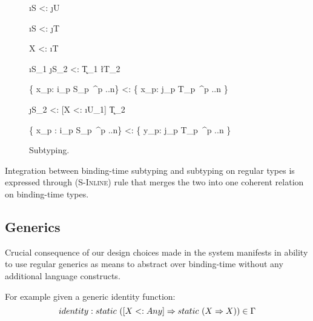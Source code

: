 \begin{figure}[H]


  {\Gamma \tsv \i{S} <: \j{U}}

  {\Gamma \tsv \i{S} <: \j{T}}

  {\Gamma \tsv X <: \i{T}}


  {\Gamma \tsv \i{S_1} \ra \j{S_2} <: \k{T_1} \ra \l{T_2}}

  {\{ x_p: i_p S_p\ ^{p ..n}\} <: \{ x_p: j_p T_p\ ^{p ..n} \}}

  {\Gamma \tsv [X <: \i{U_1}] \ra \j{S_2} <: [X <: \i{U_1}] \ra \k{T_2}}

  {\{ x_p : i_p S_p\ ^{p ..n}\} <: \{ y_p: j_p T_p\ ^{p ..n} \} }
\caption{Subtyping.}
\end{figure}

Integration between binding-time subtyping and subtyping on regular types is expressed through
(\textsc{S-Inline}) rule that merges the two into one coherent relation on binding-time types.

\subsection{Generics}

Crucial consequence of our design choices made in the system manifests in ability to use
regular generics as means to abstract over binding-time without any additional language constructs.

For example given a generic identity function:
\begin{equation}\nonumber
  identity: static\ ([X <: Any] \Rightarrow static\ (X \Rightarrow X)) \in \Gamma
\end{equation}

